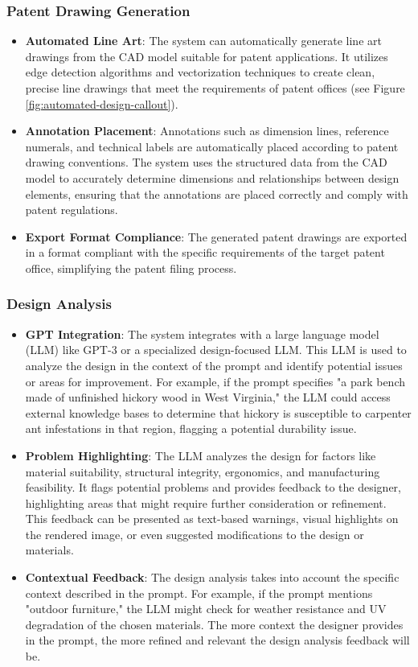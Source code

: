 \documentclass{article}
\begin{document}
\subsubsection{Patent Drawing Generation}
\begin{itemize}
\item \textbf{Automated Line Art}: The system can automatically generate line art drawings from the CAD model suitable for patent applications. It utilizes edge detection algorithms and vectorization techniques to create clean, precise line drawings that meet the requirements of patent offices (see Figure \ref{fig:automated-design-callout}).
\item \textbf{Annotation Placement}: Annotations such as dimension lines, reference numerals, and technical labels are automatically placed according to patent drawing conventions. The system uses the structured data from the CAD model to accurately determine dimensions and relationships between design elements, ensuring that the annotations are placed correctly and comply with patent regulations.
\item \textbf{Export Format Compliance}: The generated patent drawings are exported in a format compliant with the specific requirements of the target patent office, simplifying the patent filing process.
\end{itemize}


\subsubsection{Design Analysis}
\begin{itemize}
\item \textbf{GPT Integration}: The system integrates with a large language model (LLM) like GPT-3 or a specialized design-focused LLM. This LLM is used to analyze the design in the context of the prompt and identify potential issues or areas for improvement. For example, if the prompt specifies "a park bench made of unfinished hickory wood in West Virginia," the LLM could access external knowledge bases to determine that hickory is susceptible to carpenter ant infestations in that region, flagging a potential durability issue.
\item \textbf{Problem Highlighting}: The LLM analyzes the design for factors like material suitability, structural integrity, ergonomics, and manufacturing feasibility. It flags potential problems and provides feedback to the designer, highlighting areas that might require further consideration or refinement. This feedback can be presented as text-based warnings, visual highlights on the rendered image, or even suggested modifications to the design or materials.
\item \textbf{Contextual Feedback}: The design analysis takes into account the specific context described in the prompt. For example, if the prompt mentions "outdoor furniture," the LLM might check for weather resistance and UV degradation of the chosen materials. The more context the designer provides in the prompt, the more refined and relevant the design analysis feedback will be.
\end{itemize}
\end{document}

